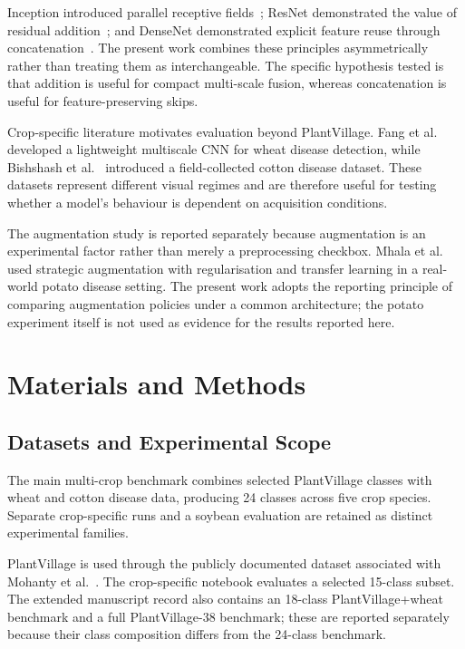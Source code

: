 \documentclass[a4paper,fleqn]{cas-dc}
\begin{document}
Inception introduced parallel receptive fields~\citep{szegedy2015}; ResNet demonstrated the value of residual addition~\citep{he2016}; and DenseNet demonstrated explicit feature reuse through concatenation~\citep{huang2017}. The present work combines these principles asymmetrically rather than treating them as interchangeable. The specific hypothesis tested is that addition is useful for compact multi-scale fusion, whereas concatenation is useful for feature-preserving skips.

Crop-specific literature motivates evaluation beyond PlantVillage. Fang et al.~\citep{fang2023} developed a lightweight multiscale CNN for wheat disease detection, while Bishshash et al.~\citep{cotton2024} introduced a field-collected cotton disease dataset. These datasets represent different visual regimes and are therefore useful for testing whether a model's behaviour is dependent on acquisition conditions.

The augmentation study is reported separately because augmentation is an experimental factor rather than merely a preprocessing checkbox. Mhala et al.~\citep{mhala2025} used strategic augmentation with regularisation and transfer learning in a real-world potato disease setting. The present work adopts the reporting principle of comparing augmentation policies under a common architecture; the potato experiment itself is not used as evidence for the results reported here.

\section{Materials and Methods}
\subsection{Datasets and Experimental Scope}
The main multi-crop benchmark combines selected PlantVillage classes with wheat and cotton disease data, producing 24 classes across five crop species. Separate crop-specific runs and a soybean evaluation are retained as distinct experimental families.

PlantVillage is used through the publicly documented dataset associated with Mohanty et al.~\citep{mohanty2016}. The crop-specific notebook evaluates a selected 15-class subset. The extended manuscript record also contains an 18-class PlantVillage+wheat benchmark and a full PlantVillage-38 benchmark; these are reported separately because their class composition differs from the 24-class benchmark.
\end{document}
